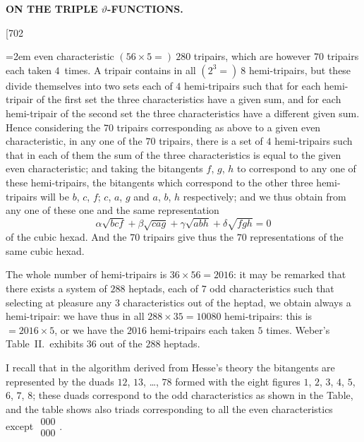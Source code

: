 \documentclass[12pt,a4paper]{article}
\theoremstyle{definition}
\begin{document}
\setlength{\parindent}{1.5em}
\setlength{\parskip}{0pt plus 1pt}

\thispagestyle{empty}
\begin{center}
\large\bfseries ON THE TRIPLE $\vartheta$-FUNCTIONS.\par\vspace{0.5em}
\normalsize\normalfont [702
\end{center}

\vspace{1em}

\noindent\hangindent=2em even characteristic $(56 \times 5 =)\ 280$ tripairs, which are however $70$ tripairs each taken $4$~times. A tripair contains in all $(2^3 =)\ 8$ hemi-tripairs, but these divide themselves into two sets each of $4$ hemi-tripairs such that for each hemi-tripair of the first set the three characteristics have a given sum, and for each hemi-tripair of the second set the three characteristics have a different given sum. Hence considering the $70$ tripairs corresponding as above to a given even characteristic, in any one of the $70$ tripairs, there is a set of $4$ hemi-tripairs such that in each of them the sum of the three characteristics is equal to the given even characteristic; and taking the bitangents $f$, $g$, $h$ to correspond to any one of these hemi-tripairs, the bitangents which correspond to the other three hemi-tripairs will be $b$, $c$, $f$; $c$, $a$, $g$ and $a$, $b$, $h$ respectively; and we thus obtain from any one of these one and the same representation
\[
\alpha\sqrt{bcf} + \beta\sqrt{cag} + \gamma\sqrt{abh} + \delta\sqrt{fgh} = 0
\]
of the cubic hexad. And the $70$ tripairs give thus the $70$ representations of the same cubic hexad.

The whole number of hemi-tripairs is $36 \times 56 = 2016$: it may be remarked that there exists a system of $288$ heptads, each of $7$ odd characteristics such that selecting at pleasure any $3$ characteristics out of the heptad, we obtain always a hemi-tripair: we have thus in all $288 \times 35 = 10080$ hemi-tripairs: this is $= 2016 \times 5$, or we have the $2016$ hemi-tripairs each taken $5$ times. Weber's Table~II.\ exhibits $36$ out of the $288$ heptads.

I recall that in the algorithm derived from Hesse's theory the bitangents are represented by the duads $12$, $13$, \dots, $78$ formed with the eight figures $1$, $2$, $3$, $4$, $5$, $6$, $7$, $8$; these duads correspond to the odd characteristics as shown in the Table, and the table shows also triads corresponding to all the even characteristics except $\begin{matrix} 000 \\ 000 \end{matrix}$.
\end{document}
